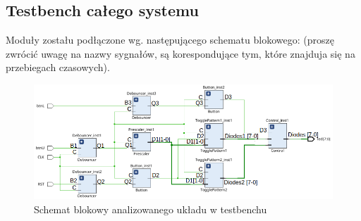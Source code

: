 \documentclass{article}
\begin{document}
\subsection{Testbench całego systemu}
Moduły zostału podłączone wg. następującego schematu blokowego: (proszę zwrócić uwagę na nazwy sygnałów, są korespondujące tym, które 
znajduja się na przebiegach czasowych).

\begin{figure} [H]
	\begin{center}
			\includegraphics[scale = 0.5]{schemat_blok.png}
			\caption{Schemat blokowy analizowanego układu w testbenchu}
\end{center}
\end{figure}
\end{document}
